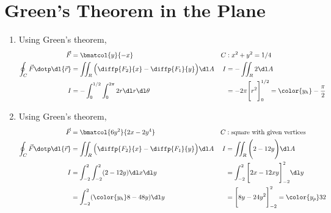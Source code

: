 \section{Green's Theorem in the Plane}

\begin{enumerate}
    \item Using Green's theorem,
          \begin{align}
              \vec{F} & = \bmatcol{y}{-x}                                            &
              C       & : x^2 + y^2 = 1/4                                              \\
              \oint_C \vec{F} \dotp \dl{\vec{r}}
                      & = \iint_R \Big( \diffp {F_2}{x} - \diffp{F_1}{y} \Big) \dl A &
              I       & = -\iint_R 2 \dl A                                             \\
              I       & = -\int_{0}^{1/2} \int_{0}^{2\pi} 2r \dl r \dl \theta        &
                      & = -2\pi \Bigg[r^2\Bigg]_0^{1/2}
              = \color{y_h} -\frac{\pi}{2}
          \end{align}

    \item Using Green's theorem,
          \begin{align}
              \vec{F} & = \bmatcol{6y^2}{2x - 2y^4}                                  &
              C       & : \text{square with given vertices}                            \\
              \oint_C \vec{F} \dotp \dl{\vec{r}}
                      & = \iint_R \Big( \diffp {F_2}{x} - \diffp{F_1}{y} \Big) \dl A &
              I       & = \iint_R \Bigg( 2 - 12y \Bigg) \dl A                          \\
              I       & = \int_{-2}^{2} \int_{-2}^{2} (2 - 12y) \dl x \dl y          &
                      & =  \int_{-2}^{2} \Bigg[ 2x - 12xy \Bigg]_{-2}^{2} \dl y        \\
                      & = \int_{-2}^{2} ({\color{y_h} 8 - 48y}) \dl y                &
                      & = \Bigg[ 8y - 24y^2 \Bigg]_{-2}^{2}
              = \color{y_p} 32
          \end{align}


\end{enumerate}
